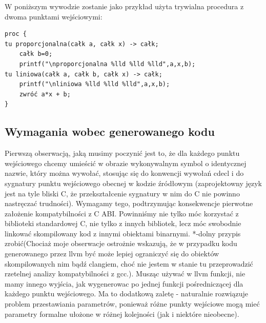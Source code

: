 W poniższym wywodzie zostanie jako przykład użyta trywialna procedura z dwoma punktami wejściowymi:
\begin{lstlisting}
proc {
tu proporcjonalna(całk a, całk x) -> całk;
	całk b=0;
	printf("\nproporcjonalna %lld %lld %lld",a,x,b);
tu liniowa(całk a, całk b, całk x) -> całk;
	printf("\nliniowa %lld %lld %lld",a,x,b);
	zwróć a*x + b;
}
\end{lstlisting}

\subsection{Wymagania wobec generowanego kodu}
Pierwszą obserwacją, jaką musimy poczynić jest to, że dla każdego punktu wejściowego chcemy umieścić w obrazie wykonywalnym symbol o identycznej nazwie, który można wywołać, stosując się do konwencji wywołań cdecl i do sygnatury punktu wejściowego obecnej w kodzie źródłowym (zaprojektowny język jest na tyle bliski C, że przekształcenie sygnatury w nim do C nie powinno nastręczać trudności). Wymagamy tego, podtrzymując konsekwencje pierwotne założenie kompatybilności z C ABI. Powinniśmy nie tylko móc korzystać z biblioteki standardowej C, nie tylko z innych bibliotek, lecz móc swobodnie linkować skompilowany kod z innymi obiektami binarnymi. *-dolny przypis zrobić(Chociaż moje obserwacje ostrożnie wskazują, że w przypadku kodu generowanego przez llvm być może lepiej ograniczyć się do obiektów skompilowanych nim bądź clangiem, choć nie jestem w stanie tu przeprowadzić rzetelnej analizy kompatybilności z gcc.). Musząc używać w llvm funkcji, nie mamy innego wyjścia, jak wygenerowac po jednej funkcji pośredniczącej dla każdego punktu wejściowego. Ma to dodatkową zaletę - naturalnie rozwiązuje problem przestawiania parametrów, ponieważ różne punkty wejściowe mogą mieć parametry formalne ułożone w różnej kolejności (jak i niektóre nieobecne).

